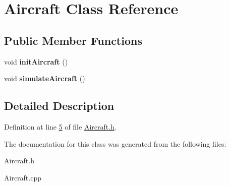 \hypertarget{class_aircraft}{}\section{Aircraft Class Reference}
\label{class_aircraft}
\subsection*{Public Member Functions}
\begin{DoxyCompactItemize}
\item 
\mbox{\label{class_aircraft_ae4436b1de6bdf2702816643fc787c4ec}} 
void {\bfseries init\+Aircraft} ()
\item 
\mbox{\label{class_aircraft_afc4b47817c55b981e41c7e6cecdb80df}} 
void {\bfseries simulate\+Aircraft} ()
\end{DoxyCompactItemize}


\subsection{Detailed Description}


Definition at line \hyperlink{_aircraft_8h_source_l00005}{5} of file \hyperlink{_aircraft_8h_source}{Aircraft.\+h}.



The documentation for this class was generated from the following files\+:\begin{DoxyCompactItemize}
\item 
Aircraft.\+h\item 
Aircraft.\+cpp\end{DoxyCompactItemize}
